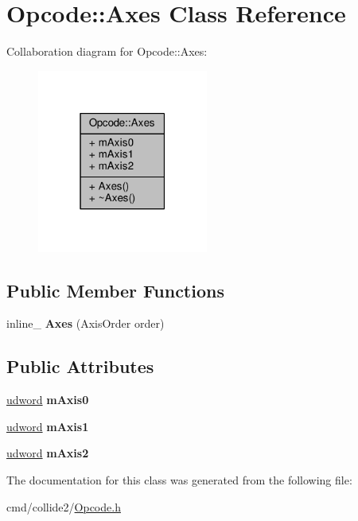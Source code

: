 \hypertarget{classOpcode_1_1Axes}{}\section{Opcode\+:\+:Axes Class Reference}
\label{classOpcode_1_1Axes}


Collaboration diagram for Opcode\+:\+:Axes\+:
\nopagebreak
\begin{figure}[H]
\begin{center}
\leavevmode
\includegraphics[width=159pt]{d5/db9/classOpcode_1_1Axes__coll__graph}
\end{center}
\end{figure}
\subsection*{Public Member Functions}
\begin{DoxyCompactItemize}
\item 
inline\+\_\+ {\bfseries Axes} (Axis\+Order order)\hypertarget{classOpcode_1_1Axes_a4a97d1a53d0a2821eaafa670dd887975}{}\label{classOpcode_1_1Axes_a4a97d1a53d0a2821eaafa670dd887975}

\end{DoxyCompactItemize}
\subsection*{Public Attributes}
\begin{DoxyCompactItemize}
\item 
\hyperlink{IceTypes_8h_a44c6f1920ba5551225fb534f9d1a1733}{udword} {\bfseries m\+Axis0}\hypertarget{classOpcode_1_1Axes_a214b0c1d878b96b527c564997e843dc3}{}\label{classOpcode_1_1Axes_a214b0c1d878b96b527c564997e843dc3}

\item 
\hyperlink{IceTypes_8h_a44c6f1920ba5551225fb534f9d1a1733}{udword} {\bfseries m\+Axis1}\hypertarget{classOpcode_1_1Axes_abd28e53899c6a42f8e1954eb70c63e07}{}\label{classOpcode_1_1Axes_abd28e53899c6a42f8e1954eb70c63e07}

\item 
\hyperlink{IceTypes_8h_a44c6f1920ba5551225fb534f9d1a1733}{udword} {\bfseries m\+Axis2}\hypertarget{classOpcode_1_1Axes_a5712523c66eed360489caaf73060b9fe}{}\label{classOpcode_1_1Axes_a5712523c66eed360489caaf73060b9fe}

\end{DoxyCompactItemize}


The documentation for this class was generated from the following file\+:\begin{DoxyCompactItemize}
\item 
cmd/collide2/\hyperlink{Opcode_8h}{Opcode.\+h}\end{DoxyCompactItemize}
